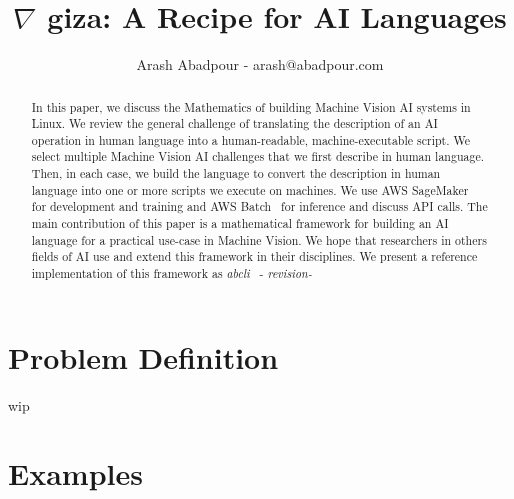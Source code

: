 \documentclass{article}
\title{$\nabla$ giza: A Recipe for AI Languages}
\author{Arash Abadpour - arash@abadpour.com}
\begin{document}
\maketitle

\begin{abstract}
In this paper, we discuss the Mathematics of building Machine Vision AI systems in Linux. We review the general challenge of translating the description of an AI operation in human language into a human-readable, machine-executable script. We select multiple Machine Vision AI challenges that we first describe in human language. Then, in each case, we build the language to convert the description in human language into one or more scripts we execute on machines. We use AWS SageMaker~\cite{aws_sage_maker} for development and training and AWS Batch~\cite{aws_batch} for inference and discuss API calls. The main contribution of this paper is a mathematical framework for building an AI language for a practical use-case in Machine Vision. We hope that researchers in others fields of AI use and extend this framework in their disciplines. We present a reference implementation of this framework as \emph{abcli}~\cite{abcli} - \emph{revision-\revision}
\end{abstract}

\tableofcontents

\section{Problem Definition}

wip

\section{Examples}




\end{document}
